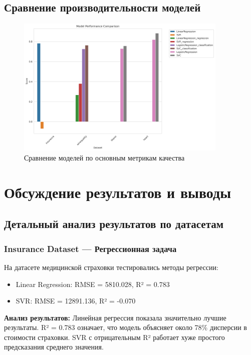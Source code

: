 \documentclass[a4paper]{article}
\begin{document}
\subsection{Сравнение производительности моделей}

\begin{figure}[H]
\centering
\includegraphics[width=0.9\textwidth]{images/model_comparison.png}
\caption{Сравнение моделей по основным метрикам качества}
\end{figure}

\section{Обсуждение результатов и выводы}

\subsection{Детальный анализ результатов по датасетам}

\subsubsection{Insurance Dataset — Регрессионная задача}

На датасете медицинской страховки тестировались методы регрессии:
\begin{itemize}
    \item Linear Regression: RMSE = 5810.028, R² = 0.783
    \item SVR: RMSE = 12891.136, R² = -0.070
\end{itemize}

\textbf{Анализ результатов:}
Линейная регрессия показала значительно лучшие результаты. R² = 0.783 означает, что модель объясняет около 78\% дисперсии в стоимости страховки. SVR с отрицательным R² работает хуже простого предсказания среднего значения.
\end{document}
